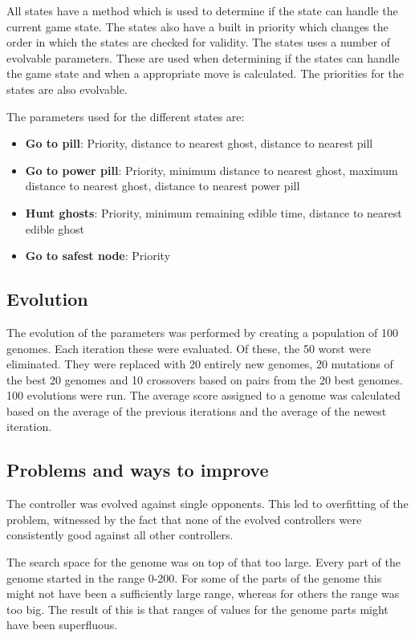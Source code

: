 \documentclass[conference]{IEEEtran}
\begin{document}
All states have a method which is used to determine if the state can handle the current game state. The states also have a built in
priority which changes the order in which the states are checked for validity. The states uses a number of evolvable parameters. These
are used when determining if the states can handle the game state and when a appropriate move is calculated. The
priorities for the states are also evolvable.

The parameters used for the different states are:

\begin{itemize}
\item \textbf{Go to pill}: Priority, distance to nearest ghost, distance to nearest pill
\item \textbf{Go to power pill}: Priority, minimum distance to nearest ghost,  maximum distance to nearest ghost, distance to nearest power pill
\item \textbf{Hunt ghosts}: Priority, minimum remaining edible time, distance to nearest edible ghost
\item \textbf{Go to safest node}: Priority
\end{itemize}

\subsection*{Evolution}

The evolution of the parameters was performed by creating a population of 100 genomes. Each iteration these were evaluated. Of these, the
50 worst were eliminated. They were replaced with 20 entirely new genomes, 20 mutations of the best 20 genomes and 10 crossovers based on
pairs from the 20 best genomes. 100 evolutions were run. The average score assigned to a genome was calculated based on the average of the
previous iterations and the average of the newest iteration.

\subsection*{Problems and ways to improve}

The controller was evolved against single opponents. This led to overfitting of the problem, witnessed by the fact that none of the evolved
controllers were consistently good against all other controllers.

The search space for the genome was on top of that too large. Every part of the genome started in the range 0-200. For some of the
parts of the genome this might not have been a sufficiently large range, whereas for others the range was too big. The result of this is
that ranges of values for the genome parts might have been superfluous.
\end{document}
